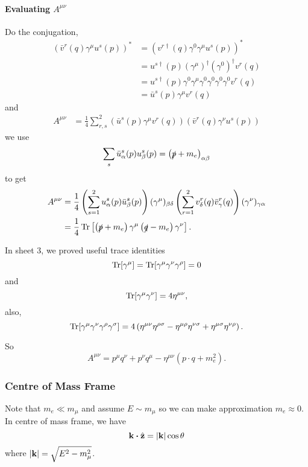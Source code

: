 \documentclass[a4paper,11pt]{article}
\begin{document}
	\paragraph{Evaluating $A ^{\mu \nu}$}
	Do the conjugation,
	\begin{align*}
		(\bar v^r (q) \gamma^\mu u^s(p))^* &= (v^{r\dagger} (q) \gamma^0 \gamma^\mu u^s(p))^*\\
		& = u^{s\dagger}(p) (\gamma^\mu)^{\dagger} (\gamma^0)^{\dagger} v^r(q)\\
		& = u^{s\dagger}(p) \gamma^0 \gamma^\mu \gamma^0 \gamma^0 \gamma^0 \gamma^0 v^r(q)\\
		& = \bar u^s(p) \gamma^\mu v^r(q)
	\end{align*}
	and
	\begin{align*}
		A ^{\mu \nu} & = \frac{1}{4} \sum _{r,s}^2 (\bar u^s(p) \gamma^\mu v^r(q)) (\bar v^r(q) \gamma^\nu u^s(p))
	\end{align*}
	we use 
	\[
		\sum_s \bar u^s_\alpha(p) u^s_\beta(p) = \left(\slashed{p} + m_e\right) _{\alpha \beta}
	\]
	to get 
	\begin{align*}
		A ^{\mu \nu} & = \frac{1}{4} \left( \sum _{s = 1}^2 u^s_\alpha(p) \bar u^s_\beta(p) \right) (\gamma^\mu)_{\beta \delta} \left( \sum _{r = 1}^2 v^r_\delta(q) \bar v^r_\gamma(q) \right) (\gamma^\nu)_{\gamma \alpha}\\
		& = \frac{1}{4} \Tr\left[ \left( \slashed{p} + m_e \right) \gamma^\mu \left( \slashed{q} - m_e \right) \gamma^\nu \right].
	\end{align*}
	
	In sheet 3, we proved useful trace identities
	\[
		\Tr[\gamma^\mu] = \Tr[\gamma^\mu \gamma^\nu \gamma^\rho] = 0
	\]
	and 
	\[
		\Tr[\gamma^\mu \gamma^\nu] = 4 \eta ^{\mu \nu},
	\]
	also,
	\[
		\Tr[\gamma^\mu \gamma^\nu \gamma^\rho \gamma^\sigma] = 4\left( \eta ^{\mu \nu} \eta ^{\rho \sigma} - \eta ^{\mu \rho} \eta ^{\nu \sigma} + \eta ^{\mu \sigma} \eta ^{\nu \rho} \right).
	\]
	
	So 
	\[
		A ^{\mu \nu} = p^\mu q^\nu + p^\nu q^\mu - \eta ^{\mu \nu} (p \cdot q + m_e^2).
	\]
	
	\subsubsection{Centre of Mass Frame}

	Note that $m_e \ll m_\mu$ and assume $E \sim m_\mu$ so we can make approximation $m_e \approx 0$. In centre of mass frame,  we have
	\[
		\vb k \vdot \hat{\vb z} = \abs{\vb k}\cos \theta
	\]
	where $\abs{\vb k}=\sqrt{E^2 - m_\mu^2}$.
	
\end{document}
